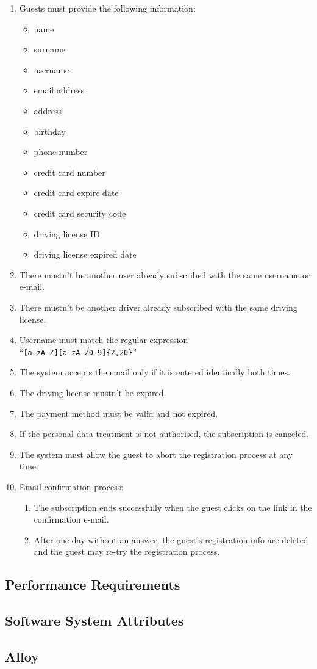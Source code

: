 \begin{enumerate}
	\item Guests must provide the following information:
	\begin{itemize}
		\item name
		\item surname
		\item username
		\item email address
		\item address
		\item birthday
		\item phone number
		\item credit card number
		\item credit card expire date
		\item credit card security code
		\item driving license ID
		\item driving license expired date	
	\end{itemize}
	\item There mustn't be another user already subscribed with the same username or e-mail. \label{f-sameinfo}
	\item There mustn't be another driver already subscribed with the same driving license. \label{f-samelicense}	
	\item Username must match the regular expression\\``\texttt{[a-zA-Z][a-zA-Z0-9]\{2,20\}}''    \label{f-usrn}
	\item The system accepts the email only if it is entered identically both times.\label{f-wrongmail}
	\item The driving license mustn't be expired.
	\label{f-licenseexp}
	\item The payment method must be valid and not expired.
	\label{f-cc}
	\item If the personal data treatment is not authorised, the subscription is canceled. \label{f-dataTreat}
	\item The system must allow the guest to abort the registration process at any time.
	\item Email confirmation process:
	\begin{enumerate}
		\item The subscription ends successfully when the guest clicks on the link in the confirmation e-mail.
		\item After one day without an answer, the guest's registration info are deleted and the guest may re-try the registration process.  \label{f-confirm}
	\end{enumerate}
\end{enumerate}

\subsection{Performance Requirements}

\subsection{Software System Attributes}

\subsection{Alloy}